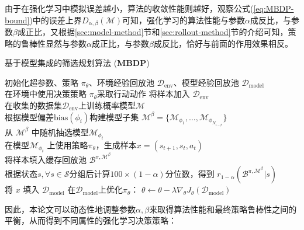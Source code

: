 由于在强化学习中模拟误差越小，算法的收敛性能则越好，观察公式(\ref{eq:MBDP-bound})中的误差上界$D_{\alpha,\beta}(\mathcal{M})$可知，强化学习的算法性能与参数$\alpha$成反比，与参数$\beta$成正比，又根据\ref{sec:model-method}节和\ref{sec:rollout-method}节的介绍可知，策略的鲁棒性显然与参数$\alpha$成正比，与参数$\beta$成反比，恰好与前面的作用效果相反。

\begin{algorithm}[t]
\caption{基于模型集成的筛选规划算法 (\textbf{MBDP})}
\label{algo:our-method}
\begin{algorithmic}
\STATE 初始化超参数、策略 $\pi_\theta$、环境经验回放池 $\mathcal{D}_{\mathrm{env}}$、模型经验回放池 $\mathcal{D}_{\mathrm{model}}$\\
    \STATE 在环境中使用决策策略 $\pi_\theta$采取行动动作
    \STATE 将样本加入 $\mathcal{D}_{\mathrm{env}}$\\
        \STATE  在收集的数据集$\mathcal{D}_{\mathrm{env}}$上训练概率模型$\mathcal{M}$\\
        \STATE 根据模型偏差$\mathrm{bias}({\phi_i})$构建模型子集 $\mathcal{M}^\beta = \{\mathcal{M}_{\phi_1},\ldots,\mathcal{M}_{\phi_{N_{1-\beta}}}\}$\\
            \STATE 从 $\mathcal{M}^\beta$ 中随机抽选模型$\mathcal{M}_{\phi_t}$\\
            \STATE 在模型$\mathcal{M}_{\phi_t}$ 上使用策略$\pi_\theta$，生成样本$x=\left(s_{t+1},s_t,a_t\right)$ \\
            \STATE 将样本填入缓存回放池 $\mathcal{B}^{\pi,\mathcal{M}^\beta}$\\
        \ENDFOR
        \STATE 根据状态$s, \forall s\in\mathcal{S}$分组后计算$100\times(1-\alpha)$分位数，得到 $r_{1-\alpha}(\mathcal{B}^{\pi,\mathcal{M}^\beta}|s)$\\
                \STATE 将 $x$ 填入 $\mathcal{D}_{\mathrm{model}}$
            \ENDIF
        \ENDFOR
    \ENDFOR
    \STATE 在$\mathcal{D}_{\mathrm{model}}$上优化$\pi_\theta$： $\theta\leftarrow \theta - \lambda\nabla_\theta J_\theta(\mathcal{D}_{\mathrm{model}})$
\ENDFOR
\end{algorithmic}
\end{algorithm}

因此，本论文可以动态性地调整参数$\alpha,\beta$来取得算法性能和最终策略鲁棒性之间的平衡，从而得到不同属性的强化学习决策策略：

